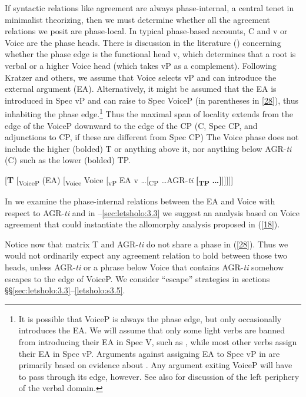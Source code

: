 \documentclass[output=paper,
modfonts
]{langscibook}
\begin{document}
If syntactic relations like agreement are always phase-internal, a central tenet in minimalist theorizing, then we must determine whether all the agreement relations we posit are phase-local. In typical phase-based accounts, C and v or Voice are the phase heads. There is discussion in the literature (\citealt{Kratzer1996,Harley2013,Legate2012,Safir2017})  concerning whether the phase edge is the functional head v, which determines that a root is verbal or a higher Voice head (which takes vP as a complement). 
Following Kratzer and others, we assume that Voice selects vP and can introduce the external argument (EA). Alternatively, it might be assumed that the EA is introduced in Spec vP and can raise to Spec VoiceP (in parentheses in \ref{28}), thus inhabiting the phase edge.\footnote{\label{fn8}It is possible that VoiceP is always the phase edge, but only occasionally introduces the EA. We will assume that only some light verbs are banned from introducing their EA in Spec V, such as , while most other verbs assign their EA in Spec vP. Arguments against assigning EA to Spec vP in \citet{Pylkkaenen2008} are primarily based on evidence about . Any argument exiting VoiceP will have to pass through its edge, however. See also \citet{Safir2017}  for discussion of the left periphery of the verbal domain.}  Thus the maximal span of locality extends from the edge of the VoiceP downward to the edge of the CP (C, Spec CP, and adjunctions to CP, if these are different from Spec CP) The Voice phase does not include the higher (bolded) T or anything above it, nor anything below AGR-\textit{ti} (C) such as the lower (bolded) TP. 


\ea \label{28} \textup{[\textbf{T}  { }  [\textsubscript{VoiceP} (EA) [\textsubscript{Voice} Voice [\textsubscript{vP} EA v …[\textsubscript{CP} …AGR-\textit{ti} \textbf{[}\textsubscript{\textbf{TP}} \textbf{…]}]]]]]} \z


In  we examine the phase-internal relations between the EA and Voice with respect to AGR-\textit{ti} and in --\ref{sec:letsholo:3.3} we suggest an analysis based on Voice agreement that could instantiate the allomorphy analysis proposed in (\ref{18}). 

Notice now that matrix T and AGR-\textit{ti} do not share a phase in (\ref{28}). Thus we would not ordinarily expect any agreement relation to hold between those two heads, unless AGR-\textit{ti} or a phrase below Voice that contains AGR-\textit{ti} somehow escapes to the edge of VoiceP. We consider ``escape'' strategies in sections §§\ref{sec:letsholo:3.3}--\ref{letsholo:s3.5}.
\end{document}

